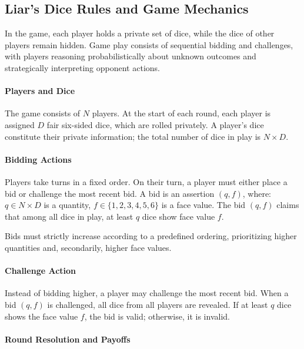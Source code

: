 \subsection{Liar’s Dice Rules and Game Mechanics}
\label{app:rules}

In the game, each player holds a private set of dice, while the dice of other players remain hidden. Game play consists of sequential bidding and challenges, with players reasoning probabilistically about unknown outcomes and strategically interpreting opponent actions.

\paragraph{\textbf{Players and Dice}}

The game consists of $N$ players. At the start of each round, each player is assigned $D$ fair six-sided dice, which are rolled privately. A player’s dice constitute their private information; the total number of dice in play is $N \times D$.

\paragraph{\textbf{Bidding Actions}}

Players take turns in a fixed order. On their turn, a player must either place a bid or challenge the most recent bid. A bid is an assertion $(q, f)$, where: $q \in N \times D$ is a quantity, $f \in \{1,2,3,4,5,6\}$ is a face value. The bid $(q, f)$ claims that among all dice in play, at least $q$ dice show face value $f$.

Bids must strictly increase according to a predefined ordering, prioritizing higher quantities and, secondarily, higher face values.

\paragraph{\textbf{Challenge Action}}

Instead of bidding higher, a player may challenge the most recent bid. When a bid $(q, f)$ is challenged, all dice from all players are revealed. If at least $q$ dice shows the face value $f$, the bid is valid; otherwise, it is invalid.

\paragraph{\textbf{Round Resolution and Payoffs}}

